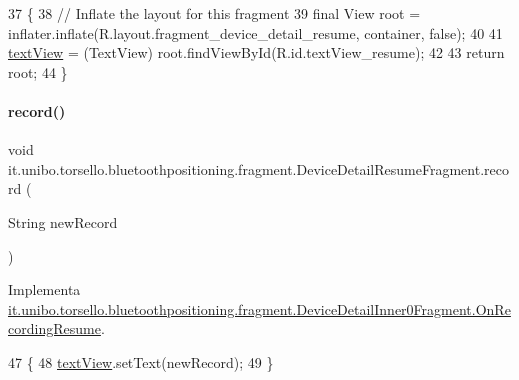 \begin{DoxyCode}
37                                                         \{
38         \textcolor{comment}{// Inflate the layout for this fragment}
39         \textcolor{keyword}{final} View root = inflater.inflate(R.layout.fragment\_device\_detail\_resume, container, \textcolor{keyword}{false});
40 
41         \hyperlink{classit_1_1unibo_1_1torsello_1_1bluetoothpositioning_1_1fragment_1_1DeviceDetailResumeFragment_a0ce36645eb31d9ab981a9dfeef206ada_a0ce36645eb31d9ab981a9dfeef206ada}{textView} = (TextView) root.findViewById(R.id.textView\_resume);
42 
43         \textcolor{keywordflow}{return} root;
44     \}
\end{DoxyCode}
\hypertarget{classit_1_1unibo_1_1torsello_1_1bluetoothpositioning_1_1fragment_1_1DeviceDetailResumeFragment_aa4b3952d75b693caa46309f0f2ca05b4_aa4b3952d75b693caa46309f0f2ca05b4}{}\label{classit_1_1unibo_1_1torsello_1_1bluetoothpositioning_1_1fragment_1_1DeviceDetailResumeFragment_aa4b3952d75b693caa46309f0f2ca05b4_aa4b3952d75b693caa46309f0f2ca05b4} 
\paragraph{\texorpdfstring{record()}{record()}}
{\footnotesize\ttfamily void it.\+unibo.\+torsello.\+bluetoothpositioning.\+fragment.\+Device\+Detail\+Resume\+Fragment.\+record (\begin{DoxyParamCaption}\item[{String}]{new\+Record }\end{DoxyParamCaption})}



Implementa \hyperlink{interfaceit_1_1unibo_1_1torsello_1_1bluetoothpositioning_1_1fragment_1_1DeviceDetailInner0Fragment_1_1OnRecordingResume_a68528e5fbaa02cb01776eba68da833d8_a68528e5fbaa02cb01776eba68da833d8}{it.\+unibo.\+torsello.\+bluetoothpositioning.\+fragment.\+Device\+Detail\+Inner0\+Fragment.\+On\+Recording\+Resume}.


\begin{DoxyCode}
47                                          \{
48         \hyperlink{classit_1_1unibo_1_1torsello_1_1bluetoothpositioning_1_1fragment_1_1DeviceDetailResumeFragment_a0ce36645eb31d9ab981a9dfeef206ada_a0ce36645eb31d9ab981a9dfeef206ada}{textView}.setText(newRecord);
49     \}
\end{DoxyCode}


